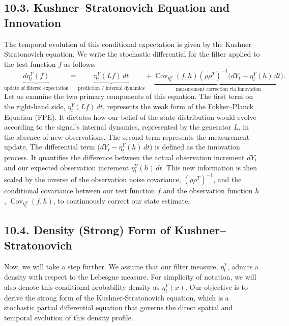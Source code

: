 \documentclass[11pt]{article}
\theoremstyle{definition}
\theoremstyle{remark}
\begin{document}
\subsection*{10.3. Kushner--Stratonovich Equation and Innovation}
The temporal evolution of this conditional expectation is given by the Kushner--Stratonovich equation. We write the stochastic differential for the filter applied to the test function $f$ as follows:
\[
\underbrace{d\eta_t^Y(f)}_{\text{update of filtered expectation}}
=
\underbrace{\eta_t^Y(Lf)\,dt}_{\text{prediction / internal dynamics}}
+
\underbrace{\operatorname{Cov}_{\eta_t^Y}(f,h)(\rho\rho^T)^{-1}\bigl(dY_t-\eta_t^Y(h)\,dt\bigr)}_{\text{measurement correction via innovation}}.
\]
Let us examine the two primary components of this equation. The first term on the right-hand side, $\eta_t^Y(Lf)\,dt$, represents the weak form of the Fokker--Planck Equation (FPE). It dictates how our belief of the state distribution would evolve according to the signal's internal dynamics, represented by the generator $L$, in the absence of new observations.
The second term represents the measurement update. The differential term $\bigl(dY_t-\eta_t^Y(h)\,dt\bigr)$ is defined as the innovation process. It quantifies the difference between the actual observation increment $dY_t$ and our expected observation increment $\eta_t^Y(h)\,dt$. This new information is then scaled by the inverse of the observation noise covariance, $(\rho\rho^T)^{-1}$, and the conditional covariance between our test function $f$ and the observation function $h$, $\operatorname{Cov}_{\eta_t^Y}(f,h)$, to continuously correct our state estimate.

\subsection*{10.4. Density (Strong) Form of Kushner--Stratonovich}
Now, we will take a step further. We assume that our filter measure, $\eta_t^Y$, admits a density with respect to the Lebesgue measure. For simplicity of notation, we will also denote this conditional probability density as $\eta_t^Y(x)$. Our objective is to derive the strong form of the Kushner-Stratonovich equation, which is a stochastic partial differential equation that governs the direct spatial and temporal evolution of this density profile.
\end{document}
